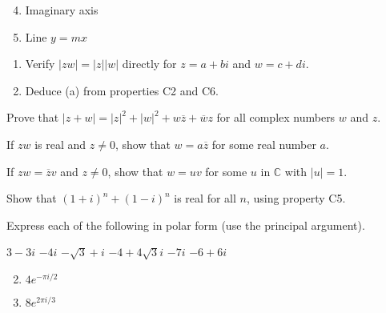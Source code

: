 \begin{multicols}{2}
\begin{ex}
\begin{sol}
\begin{enumerate}[label={\alph*.}]
\setcounter{enumi}{3}
\item  Imaginary axis

\setcounter{enumi}{5}
\item  Line $y = mx$

\end{enumerate}
\end{sol}
\end{ex}

\begin{ex}
\begin{enumerate}[label={\alph*.}]
\item Verify $|zw| = |z||w|$ directly for $z = a + bi$ and $w = c + di$.

\item Deduce (a) from properties C2 and C6.

\end{enumerate}
\end{ex}

\begin{ex}
Prove that $|z+w| = |z|^2 + |w|^2 + w\overline{z} + \overline{w}z$
 for all complex numbers $w$ and $z$.
\end{ex}

\begin{ex}
If $zw$ is real and $z \neq 0$, show that $w = a \overline{z}$
 for some real number $a$.
\end{ex}

\begin{ex}
If $zw = \overline{z}v$
 and $z \neq 0$, show that $w = uv$ for some $u$ in $\mathbb{C}$  with $|u| = 1$.
\end{ex}

\begin{ex}
Show that $(1 + i)^{n} + (1 - i)^{n}$ is real for all $n$, using property C5.
\end{ex}

\begin{ex}
Express each of the following in polar form (use the principal argument).

\begin{exenumerate}
\exitem $3 - 3i$
\exitem $-4i$
\exitem $-\sqrt{3} + i$
\exitem $-4 + 4\sqrt{3}i$
\exitem $-7i$
\exitem $-6 + 6i$
\end{exenumerate}
\begin{sol}
\begin{enumerate}[label={\alph*.}]
\setcounter{enumi}{1}
\item  $4e^{-\pi i/2}$

\setcounter{enumi}{3}
\item  $8e^{2\pi i/3}$


\end{enumerate}
\end{sol}
\end{ex}
\end{multicols}
